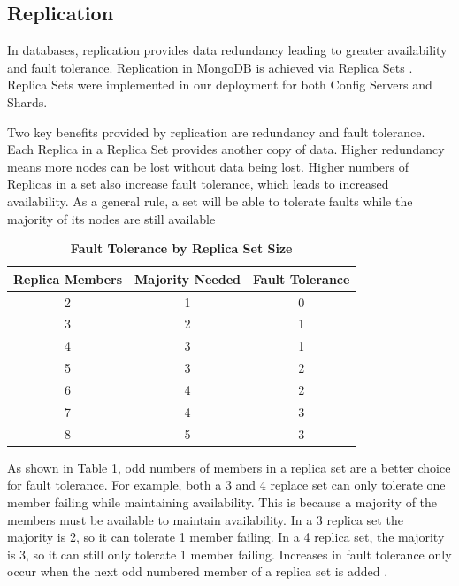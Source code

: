 \documentclass[9pt,twocolumn,twoside]{../../styles/osajnl}
\begin{document}
\subsection{Replication}

In databases, replication provides data redundancy leading to greater availability and fault tolerance.  Replication in MongoDB is achieved via Replica Sets \cite{www-replication}.  Replica Sets were implemented in our deployment for both Config Servers and Shards.

Two key benefits provided by replication are redundancy and fault tolerance.
Each Replica in a Replica Set provides another copy of data.  Higher redundancy means more nodes can be lost without data being lost. Higher numbers of Replicas in a set also increase fault tolerance, which leads to increased availability.  As a general rule, a set will be able to tolerate faults while the majority of its nodes are still available


\begin{table}[htbp]
\centering
\caption{\bf Fault Tolerance by Replica Set Size \cite{www-mongoRepDep}}

 \begin{tabular}{|c | c | c|} 
 \hline
Replica Members &  Majority Needed & Fault Tolerance \\ [0.5ex] 
 \hline\hline
    
2 &	1 &	0 \\
 \hline
3 &	2 &	1 \\ 
 \hline
4 &	3 &	1 \\ 
 \hline
5 &	3 &	2 \\ 
 \hline
6 &	4 &	2\\ 
 \hline
7 &	4 &	3\\ 
 \hline
8 &	5 &	3\\ [1ex] 
 \hline

\end{tabular}
  \label{tab:fault-tolerance}
\end{table}


As shown in Table \ref{tab:fault-tolerance}, odd numbers of members in a replica set are a better choice for fault tolerance. For example, both a 3 and 4 replace set can only tolerate one member failing while maintaining availability.  This is because a majority of the members must be available to maintain availability.  In a 3 replica set the majority is 2, so it can tolerate 1 member failing.  In a 4 replica set, the majority is 3, so it can still only tolerate 1 member failing.  Increases in fault tolerance only occur when the next odd numbered member of a replica set is added  \cite{www-mongoRepDep}.
\end{document}
